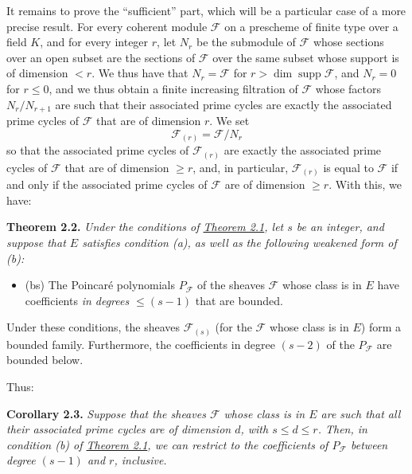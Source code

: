 \documentclass{article}
\providecommand{\tightlist}{%
  \setlength{\itemsep}{0pt}\setlength{\parskip}{0pt}}
\newenvironment{itenv}[1]
  {\phantomsection\par\smallskip\noindent\textbf{#1.}\itshape}
  {\par\smallskip}
\newcommand{\oldpage}[1]{\marginpar{\footnotesize$\Big\vert$ \textit{p.~#1}}}
\theoremstyle{definition}
\theoremstyle{definition}
\theoremstyle{definition}
\theoremstyle{definition}
\theoremstyle{remark}
\begin{document}
It remains to prove the ``sufficient'' part, which will be a particular case of a more precise result.
For every coherent module \({\mathscr{F}}\) on a prescheme of finite type over a field \(K\), and for every integer \(r\), let \(N_r\) be the submodule of \({\mathscr{F}}\) whose sections over an open subset are the sections of \({\mathscr{F}}\) over the same subset whose support is of dimension \(<r\).
We thus have that \(N_r={\mathscr{F}}\) for \(r>\dim\operatorname{supp}{\mathscr{F}}\), and \(N_r=0\) for \(r\leqslant 0\), and we thus obtain a finite increasing filtration of \({\mathscr{F}}\) whose factors \(N_r/N_{r+1}\) are such that their associated prime cycles are exactly the associated prime cycles of \({\mathscr{F}}\) that are of dimension \(r\).
We set
\[
  {\mathscr{F}}_{(r)} = {\mathscr{F}}/N_r
\]
so that the associated prime cycles of \({\mathscr{F}}_{(r)}\) are exactly the associated prime cycles of \({\mathscr{F}}\) that are of dimension \(\geqslant r\), and, in particular, \({\mathscr{F}}_{(r)}\) is equal to \({\mathscr{F}}\) if and only if the associated prime cycles of \({\mathscr{F}}\) are of dimension \(\geqslant r\).
With this, we have:

\leavevmode{}%
\begin{itenv}{Theorem 2.2}
Under the conditions of \protect\hyperlink{fga-3-iv-theorem-2.1}{Theorem 2.1}, let \(s\) be an integer, and suppose that \(E\) satisfies condition (a), as well as the following weakened form of (b):

\begin{itemize}
\tightlist
\item
  (bs) The Poincaré polynomials \(P_{\mathscr{F}}\) of the sheaves \({\mathscr{F}}\) whose class is in \(E\) have coefficients \emph{in degrees \(\leqslant(s-1)\)} that are bounded.
\end{itemize}

Under these conditions, the sheaves \({\mathscr{F}}_{(s)}\) (for the \({\mathscr{F}}\) whose class is in \(E\)) form a bounded family.
Furthermore, the coefficients in degree \((s-2)\) of the \(P_{\mathscr{F}}\) are bounded below.

\end{itenv}

\oldpage{221-07}Thus:

\leavevmode{}%
\begin{itenv}{Corollary 2.3}
Suppose that the sheaves \({\mathscr{F}}\) whose class is in \(E\) are such that all their associated prime cycles are of dimension \(d\), with \(s\leqslant d\leqslant r\).
Then, in condition (b) of \protect\hyperlink{fga-3-iv-theorem-2.1}{Theorem 2.1}, we can restrict to the coefficients of \(P_{\mathscr{F}}\) between degree \((s-1)\) and \(r\), inclusive.

\end{itenv}
\end{document}
